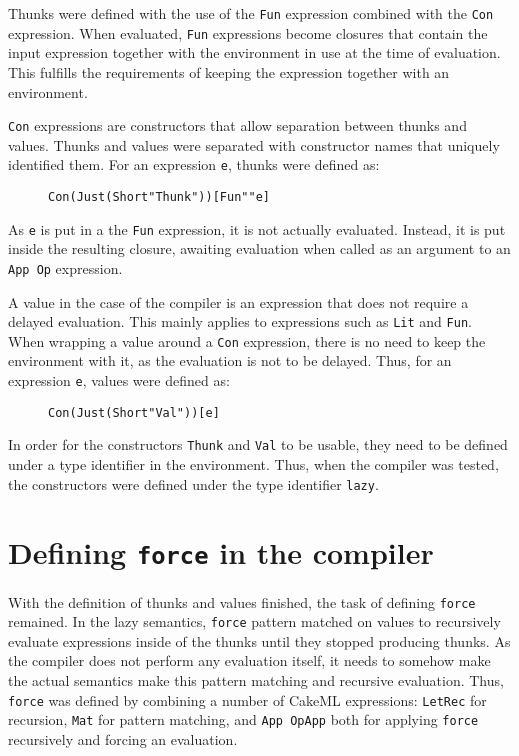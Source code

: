 Thunks were defined with the use of the \texttt{Fun} expression combined
with the \texttt{Con} expression. When evaluated, \texttt{Fun} expressions
become closures that contain the input expression together with the environment
in use at the time of evaluation. This fulfills the requirements of keeping
the expression together with an environment.

\texttt{Con} expressions are constructors that allow separation between thunks
and values. Thunks and values were separated with constructor names that
uniquely identified them. For an expression \texttt{e}, thunks were defined as:

\begin{figure}[H]
\begin{alltt}
  Con (Just (Short "Thunk")) [Fun "" e]
\end{alltt}
\end{figure}

\noindent As \texttt{e} is put in a the \texttt{Fun} expression, it is not
actually evaluated. Instead, it is put inside the resulting closure, awaiting
evaluation when called as an argument to an \texttt{App Op} expression.

A value in the case of the compiler is an expression that does not require
a delayed evaluation. This mainly applies to expressions such as \texttt{Lit}
and \texttt{Fun}. When wrapping a value around a \texttt{Con} expression, there
is no need to keep the environment with it, as the evaluation is not to be
delayed. Thus, for an expression \texttt{e}, values were defined as:

\begin{figure}[H]
\begin{alltt}
  Con (Just (Short "Val")) [e]
\end{alltt}
\end{figure}

In order for the constructors \texttt{Thunk} and \texttt{Val} to be usable,
they need to be defined under a type identifier in the environment. Thus,
when the compiler was tested, the constructors were defined under the type
identifier \texttt{lazy}.

\section{Defining \texttt{force} in the compiler}
With the definition of thunks and values finished, the task of defining
\texttt{force} remained. In the lazy semantics, \texttt{force} pattern
matched on values to recursively evaluate expressions inside of the thunks until
they stopped producing thunks. As the compiler does not perform any evaluation
itself, it needs to somehow make the actual semantics make this pattern matching
and recursive evaluation. Thus, \texttt{force} was defined by combining a number
of CakeML expressions: \texttt{LetRec} for recursion, \texttt{Mat} for pattern
matching, and \texttt{App OpApp} both for applying \texttt{force} recursively
and forcing an evaluation.

